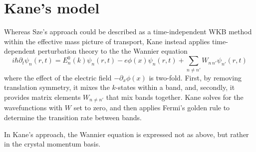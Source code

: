\section{Kane's model}
Whereas Sze's approach could be described as a time-independent WKB method within the effective mass picture of transport, Kane instead applies time-dependent perturbation theory to the the Wannier equation
$$i\hbar\partial_t\psi_n(r,t)=E_n^0(k)\psi_n(r,t)-e\phi(x)\psi_n(r,t)+\sum_{n\neq n'} W_{n\,n'}\psi_{n'}(r,t)$$
where the effect of the electric field $-\partial_x\phi(x)$ is two-fold.  First, by removing translation symmetry, it mixes the $k$-states within a band, and, secondly, it provides matrix elements $W_{n\neq n'}$ that mix bands together.  Kane solves for the wavefunctions with $W$ set to zero, and then applies Fermi's golden rule to determine the transition rate between bands.

In Kane's approach, the Wannier equation is expressed not as above, but rather in the crystal momentum basis.